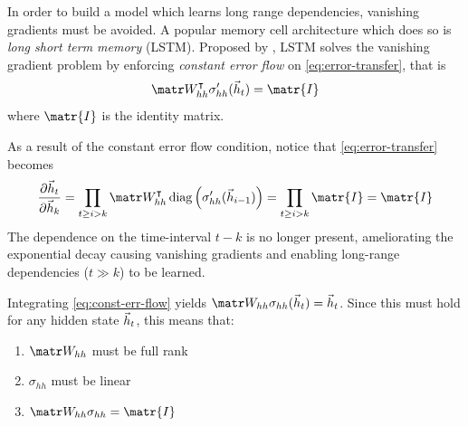 
In order to build a model which learns long range dependencies, vanishing
gradients must be avoided. A popular memory cell architecture which does so is
\emph{long short term memory} (LSTM). Proposed by \citet{hochreiter1997long},
LSTM solves the vanishing gradient problem by enforcing \emph{constant error
flow} on \cref{eq:error-transfer}, that is
\begin{equation}\label{eq:const-err-flow}
    \W_{hh}^\tp \sigma_{hh}' (\h_{t}) = \matr{I}
\end{equation}
where $\matr{I}$ is the identity matrix.

As a result of the constant error flow condition, notice that \vref{eq:error-transfer}
becomes
\begin{equation}
  \frac{\pd \h_t}{\pd \h_k}
  = \prod_{t \geq i > k} \W_{hh}^\tp \diag \left( \sigma_{hh}'( \h_{i-1} ) \right)
  = \prod_{t \geq i > k} \matr{I}
  = \matr{I}
\end{equation}
The dependence on the time-interval $t-k$ is no longer present, ameliorating
the exponential decay causing vanishing gradients and enabling long-range
dependencies (\ie $t \gg k$) to be learned.

Integrating \cref{eq:const-err-flow} yields $\W_{hh} \sigma_{hh}(\h_{t}) = \h_{t}$.
Since this must hold for any hidden state $\vec{h}_{t}$, this means that:
\begin{enumerate}
    \item $\W_{hh}$ must be full rank
    \item $\sigma_{hh}$ must be linear
    \item $\W_{hh} \sigma_{hh} = \matr{I}$
\end{enumerate}

